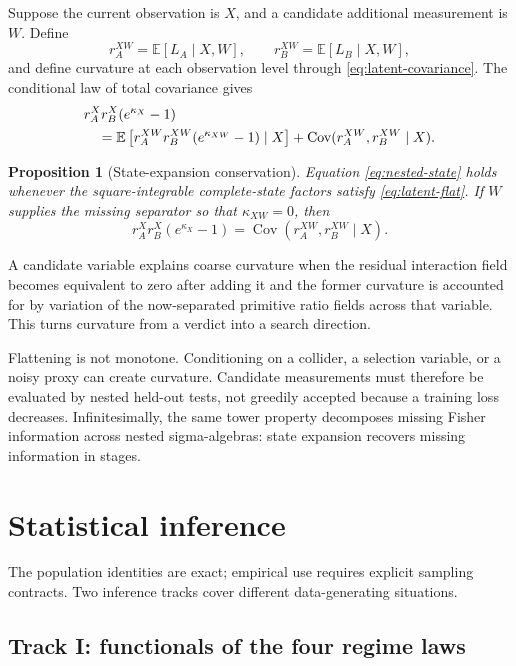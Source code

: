 \documentclass[11pt]{article}
\newtheorem{proposition}[theorem]{Proposition}
\newcommand{\E}{\mathbb{E}}
\newcommand{\Cov}{\operatorname{Cov}}
\begin{document}
Suppose the current observation is \(X\), and a candidate additional measurement is \(W\).  Define
\begin{equation}
r_A^{XW}=\E[L_A\mid X,W],
\qquad
r_B^{XW}=\E[L_B\mid X,W],
\end{equation}
and define curvature at each observation level through \eqref{eq:latent-covariance}.  The conditional law of total covariance gives
\begin{align}
&r_A^Xr_B^X(e^{\kappa_X}-1)
\notag\\
&\quad=
\E\left[r_A^{XW}r_B^{XW}(e^{\kappa_{XW}}-1)\mid X\right]
+
\Cov(r_A^{XW},r_B^{XW}\mid X).
\label{eq:nested-state}
\end{align}

\begin{proposition}[State-expansion conservation]
Equation \eqref{eq:nested-state} holds whenever the square-integrable complete-state factors satisfy \eqref{eq:latent-flat}.  If \(W\) supplies the missing separator so that \(\kappa_{XW}=0\), then
\begin{equation}
r_A^Xr_B^X(e^{\kappa_X}-1)
=
\Cov(r_A^{XW},r_B^{XW}\mid X).
\end{equation}
\end{proposition}

A candidate variable explains coarse curvature when the residual interaction field becomes equivalent to zero after adding it and the former curvature is accounted for by variation of the now-separated primitive ratio fields across that variable.  This turns curvature from a verdict into a search direction.

Flattening is not monotone.  Conditioning on a collider, a selection variable, or a noisy proxy can create curvature.  Candidate measurements must therefore be evaluated by nested held-out tests, not greedily accepted because a training loss decreases.  Infinitesimally, the same tower property decomposes missing Fisher information across nested sigma-algebras: state expansion recovers missing information in stages.

\section{Statistical inference}

The population identities are exact; empirical use requires explicit sampling contracts.  Two inference tracks cover different data-generating situations.

\subsection{Track I: functionals of the four regime laws}
\end{document}
